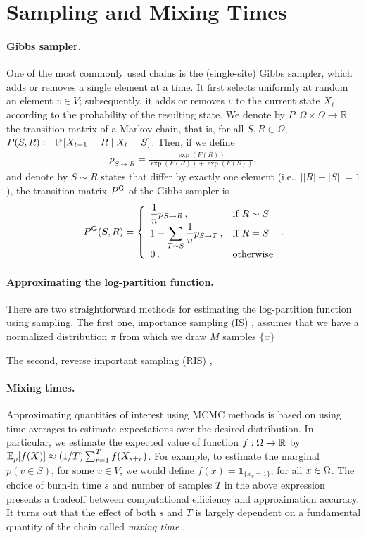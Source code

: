 \section{Sampling and Mixing Times}

\paragraph{Gibbs sampler.}
One of the most commonly used chains is the (single-site) Gibbs sampler, which adds or removes a single element %
at a time.
It first selects uniformly at random an element $v \in V$; subsequently, it adds or removes $v$ to the current state $X_t$ according to the probability of the resulting state.
We denote by $P : \Omega \times \Omega \to \mathbb{R}$ the transition matrix of a Markov chain, that is, for all $S, R \in \Omega$, $P(S, R) \defeq \P\left[ X_{t+1} = R \mid X_t = S \right]$.
Then, if we define
\begin{align*}
p_{S \rightarrow R} = \displaystyle\frac{\exp(F(R))}{\exp(F(R)) + \exp(F(S))},
\end{align*}
and denote by $S \sim R$ states that differ by exactly one element (i.e., $\big||R| - |S|\big| = 1$),
the transition matrix $\Pg$ of the Gibbs sampler is
\begin{align*}
  \Pg(S, R) = 
  \threepartdefo{\displaystyle\frac{1}{n}p_{S \rightarrow R}}{R \sim S}{1 - \displaystyle\sum_{T \sim S} \displaystyle\frac{1}{n}p_{S \rightarrow T}}{R = S}{0}.
\end{align*}

\paragraph{Approximating the log-partition function.}
There are two straightforward methods for estimating the log-partition function using sampling.
The first one, importance sampling (IS) \citep{ais}, assumes that we have a normalized distribution $\pi$ from which we draw $M$ samples $\{x\}$

The second, reverse important sampling (RIS) \citep{ris},

\paragraph{Mixing times.}
Approximating quantities of interest using MCMC methods is based on using time averages to estimate expectations over the desired distribution.
In particular, we estimate the expected value of function $f : \ss \to \mathbb{R}$ by $\E_p[f(X)] \approx (1/T)\sum_{r=1}^{T} f(X_{s + r})$.
For example, to estimate the marginal $p(v \in S)$, for some $v \in V$, we would define $f(x) = \mathds{1}_{\{x_v = 1\}}$, for all $x \in \ss$.
The choice of burn-in time $s$ and number of samples $T$ in the above expression presents a tradeoff between computational efficiency and approximation accuracy.
It turns out that the effect of both $s$ and $T$ is largely dependent on a fundamental quantity of the chain called \emph{mixing time} \cite{levin08}.

